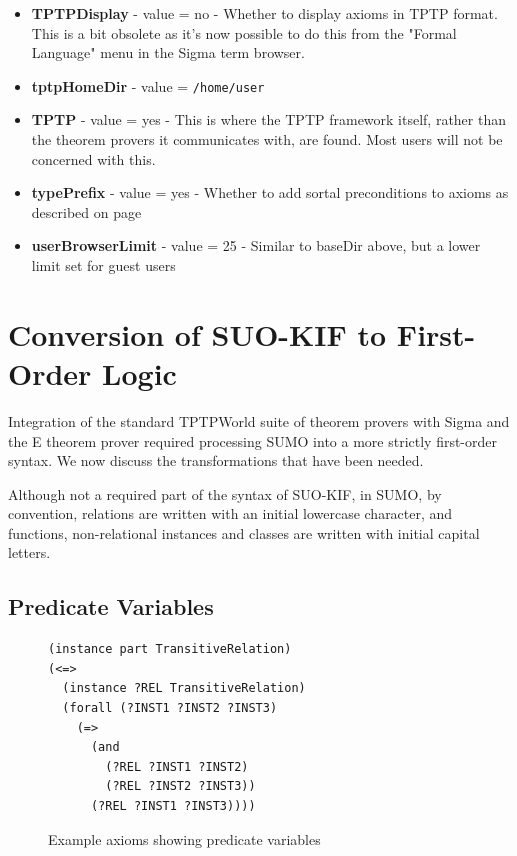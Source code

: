 \documentclass{book}
\begin{document}
\begin{itemize}
  \item \textbf{TPTPDisplay} - value = no - Whether to display axioms in TPTP format.  This is a bit
obsolete as it's now possible to do this from the "Formal Language" menu in the Sigma term browser.

  \item \textbf{tptpHomeDir} - value = \texttt{/home/user} 

  \item \textbf{TPTP} - value = yes - This is where the TPTP framework itself, rather than the
theorem provers it communicates with, are found. Most users will not be concerned with this.

  \item \textbf{typePrefix} - value = yes - Whether to add sortal preconditions to axioms as described on
page \pageref{chap:KnowRep:subsec:Sortal}

  \item \textbf{userBrowserLimit} - value = 25 - Similar to baseDir above, but a lower
limit set for guest users

\end{itemize}


\section{Conversion of SUO-KIF to First-Order Logic}
\label{chap:KnowRepr:sec:Conv}

Integration of the standard TPTPWorld suite of theorem provers
with Sigma \cite{tsp08} and the E theorem prover \cite{Schulz:AICOM-2002}
required processing SUMO into a more strictly first-order syntax. We now discuss
the transformations that have been needed.

\small
Although not a required part of the syntax of SUO-KIF, in SUMO, by convention,
relations are written with an initial lowercase character, and functions,
non-relational instances and classes are written with initial capital letters.
\normalsize

\subsection{Predicate Variables}
\label{chap:KnowRep:subsec:PredVar}  

\begin{figure}
\begin{framed}
\begin{verbatim}
(instance part TransitiveRelation)
(<=>
  (instance ?REL TransitiveRelation)
  (forall (?INST1 ?INST2 ?INST3)
    (=>
      (and
        (?REL ?INST1 ?INST2)
        (?REL ?INST2 ?INST3))
      (?REL ?INST1 ?INST3))))
\end{verbatim}
\caption{Example axioms showing predicate variables}
\label{fig:PredVarEx}
\end{framed}   
\end{figure}
\end{document}
